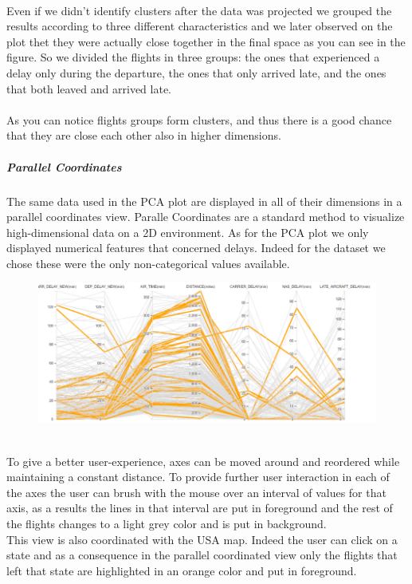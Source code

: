 \documentclass[a4paper, 12pt]{article}
\begin{document}
\\ 
Even if we didn't identify clusters after the data was projected we grouped the results according to
three different characteristics and we later observed on the plot thet they were actually close
together in the final space as you can see in the figure. So we divided the flights in three groups: the
ones that experienced a delay only during the departure, the ones that only arrived late, and the ones
that both leaved and arrived late.
\\
\\
As you can notice flights groups form clusters, and thus there is a good chance that
they are close each other also in higher dimensions.
\clearpage

\subparagraph{Parallel Coordinates}
The same data used in the PCA plot are displayed in all of their dimensions in a parallel coordinates
view. Paralle Coordinates are a standard method to visualize high-dimensional data on a 2D environment. 
As for the PCA plot we only displayed numerical features that concerned delays. Indeed for the dataset we
chose these were the only non-categorical values available.
\\
\begin{figure}[h]	
\centering
\includegraphics[scale=0.7]{pc.PNG}
\end{figure}\\
To give a better user-experience, axes can be moved around and reordered while maintaining a constant 
distance. To provide further user interaction in each of the axes the user can brush with the mouse over
an interval of values for that axis, as a results the lines in that interval are put in foreground and
the rest of the flights changes to a light grey color and is put in background.
\\
This view is also coordinated with the USA map. Indeed the user can click on a state and as a 
consequence in the parallel coordinated view only the flights that left that state are highlighted in an
orange color and put in foreground.
\end{document}
